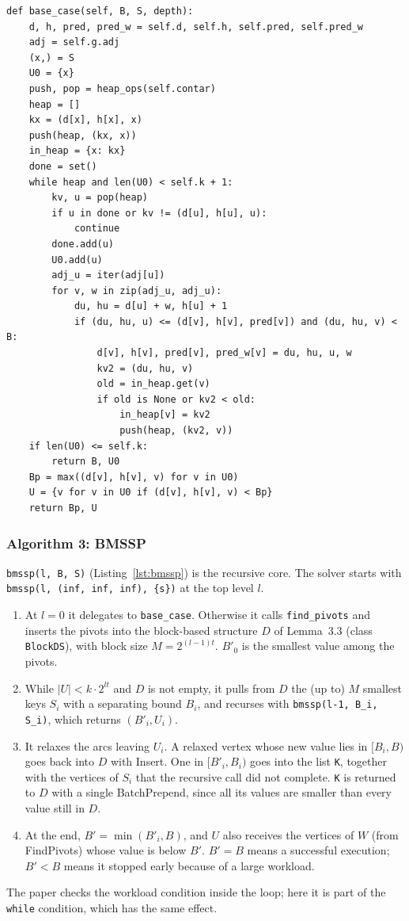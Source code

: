 \begin{lstlisting}[style=pycode, caption={Algorithm 2, BaseCase (\texttt{duan.py}).}, label={lst:basecase}]
def base_case(self, B, S, depth):
    d, h, pred, pred_w = self.d, self.h, self.pred, self.pred_w
    adj = self.g.adj
    (x,) = S
    U0 = {x}
    push, pop = heap_ops(self.contar)
    heap = []
    kx = (d[x], h[x], x)
    push(heap, (kx, x))
    in_heap = {x: kx}
    done = set()
    while heap and len(U0) < self.k + 1:
        kv, u = pop(heap)
        if u in done or kv != (d[u], h[u], u):
            continue
        done.add(u)
        U0.add(u)
        adj_u = iter(adj[u])
        for v, w in zip(adj_u, adj_u):
            du, hu = d[u] + w, h[u] + 1
            if (du, hu, u) <= (d[v], h[v], pred[v]) and (du, hu, v) < B:
                d[v], h[v], pred[v], pred_w[v] = du, hu, u, w
                kv2 = (du, hu, v)
                old = in_heap.get(v)
                if old is None or kv2 < old:
                    in_heap[v] = kv2
                    push(heap, (kv2, v))
    if len(U0) <= self.k:
        return B, U0
    Bp = max((d[v], h[v], v) for v in U0)
    U = {v for v in U0 if (d[v], h[v], v) < Bp}
    return Bp, U
\end{lstlisting}

\subsubsection{Algorithm 3: BMSSP}

\texttt{bmssp(l, B, S)} (Listing~\ref{lst:bmssp}) is the recursive core. The solver starts
with \texttt{bmssp(l, (inf, inf, inf), \{s\})} at the top level $l$.
\begin{enumerate}
  \item At $l=0$ it delegates to \texttt{base\_case}. Otherwise it calls
        \texttt{find\_pivots} and inserts the pivots into the block-based structure $D$ of
        Lemma~3.3 (class \texttt{BlockDS}), with block size $M=2^{(l-1)t}$. $B'_0$ is the
        smallest value among the pivots.
  \item While $|U| < k\cdot 2^{lt}$ and $D$ is not empty, it pulls from $D$ the (up to)
        $M$ smallest keys $S_i$ with a separating bound $B_i$, and recurses with
        \texttt{bmssp(l-1, B\_i, S\_i)}, which returns $(B'_i, U_i)$.
  \item It relaxes the arcs leaving $U_i$. A relaxed vertex whose new value lies in
        $[B_i, B)$ goes back into $D$ with Insert. One in $[B'_i, B_i)$ goes into the list
        \texttt{K}, together with the vertices of $S_i$ that the recursive call did not
        complete. \texttt{K} is returned to $D$ with a single BatchPrepend, since all its
        values are smaller than every value still in $D$.
  \item At the end, $B'=\min(B'_i, B)$, and $U$ also receives the vertices of $W$ (from
        FindPivots) whose value is below $B'$. $B'=B$ means a successful execution;
        $B'<B$ means it stopped early because of a large workload.
\end{enumerate}
The paper checks the workload condition inside the loop; here it is part of the
\texttt{while} condition, which has the same effect.

